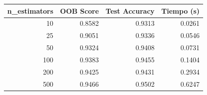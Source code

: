 \begin{tabular}{rrrr}
\toprule
n\_estimators & OOB Score & Test Accuracy & Tiempo (s) \\
\midrule
10 & 0.8582 & 0.9313 & 0.0261 \\
25 & 0.9051 & 0.9336 & 0.0546 \\
50 & 0.9324 & 0.9408 & 0.0731 \\
100 & 0.9383 & 0.9455 & 0.1404 \\
200 & 0.9425 & 0.9431 & 0.2934 \\
500 & 0.9466 & 0.9502 & 0.6247 \\
\bottomrule
\end{tabular}
